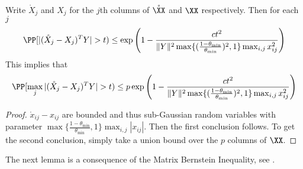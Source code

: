 \begin{lemma} Write $\mathring{X}_j$ and $X_j$ for the $j$th columns of $\mathring{\XX}$ and $\XX$ respectively. Then for each $j$
\begin{equation}
\PP [ |(\mathring{X}_j - X_j)^T Y| > t) \leq \exp \left( 1 - \frac{c t^2}{\|Y\|^2 \max \lbrace (\frac{1-\theta_{\min}}{\theta_{\min}})^2, 1 \rbrace \max_{i,j} x_{ij}^2} \right)
\end{equation}
This implies that
\begin{equation}
\PP [ \max_j |(\mathring{X}_j - X_j)^T Y | > t) \leq p \exp \left( 1 - \frac{c t^2}{\|Y\|^2 \max \lbrace (\frac{1-\theta_{\min}}{\theta_{\min}})^2, 1 \rbrace \max_{i,j} x_{ij}^2} \right)
\end{equation}
\end{lemma}
\begin{proof}
$\mathring{x}_{ij} - x_{ij}$ are bounded and thus sub-Gaussian random variables with parameter $\max \lbrace \frac{1-\theta_{\min}}{\theta_{\min}}, 1 \rbrace  \max_{i,j} |x_{ij}|$. Then the first conclusion follows. To get the second conclusion, simply take a union bound over the $p$ columns of $\XX$.
\end{proof}

The next lemma is a consequence of the Matrix Bernstein Inequality, see \cite{Tropp:2012}.

